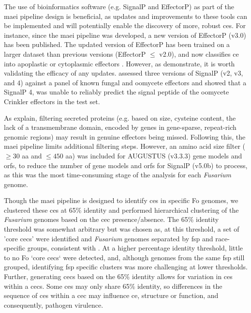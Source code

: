 \bigskip
\noindent
The use of bioinformatics software (e.g. SignalP and EffectorP) as part of the \ac{maei} pipeline design is beneficial, as updates and improvements to these tools can be implemented and will potentially enable the discovery of more, robust \acp{ce}. For instance, since the \ac{maei} pipeline was developed, a new version of EffectorP (v3.0) has been published. The updated version of EffectorP has been trained on a larger dataset than previous versions (EffectorP $\le$ v2.0), and now classifies \acl{ce} into apoplastic or cytoplasmic effectors \parencite{Sperschneider2022}. However, as \textcite{Sperschneider2015c} demonstrate, it is worth validating the efficacy of any updates. \textcite{Sperschneider2015c} assessed three versions of SignalP (v2, v3, and 4) against a panel of known fungal and oomycete effectors and showed that a SignalP 4, was unable to reliably predict the signal peptide of the oomycete Crinkler effectors in the test set. 

As \textcite{LoPresti2015, Sperschneider2015, Sperschneider2015c} explain, filtering secreted proteins (e.g. based on size, cysteine content, the lack of a transmembrane domain, encoded by genes in gene-sparse, repeat-rich genomic regions) may result in genuine effectors being missed. Following this, the \ac{maei} pipeline limits additional filtering steps. However, an amino acid size filter ($\geq30$ aa and $\leq450$ aa) was included for AUGUSTUS (v3.3.3) gene models and \acp{orf}, to reduce the number of gene models and \acp{orf} for SignalP (v5.0b) to process, as this was the most time-consuming stage of the analysis for each \textit{Fusarium} genome. 

Though the \ac{maei} pipeline is designed to identify \acp{ce} in specific \ac{Fo} genomes, we clustered these \acp{ce} at 65\% identity and performed hierarchical clustering of the \textit{Fusarium} genomes based on the \ac{cec} presence/absence. The 65\% identity threshold was somewhat arbitrary but was chosen as, at this threshold, a set of 'core  \acp{cec}' were identified and \textit{Fusarium} genomes separated by \ac{fsp} and race-specific groups, consistent with \textcite{Dam2016,FoEC2}. At a higher percentage identity threshold, little to no \ac{Fo} `core \acp{cec}` were detected, and, although genomes from the same \ac{fsp} still grouped, identifying \ac{fsp} specific clusters was more challenging at lower thresholds. Further, generating \acp{cec} based on the 65\% identity allows for variation in \aclp{ce} within a \acp{cec}. Some \acp{ce} may only share 65\% identity, so differences in the sequence of \acp{ce} within a \ac{cec} may influence \ac{ce}, structure or function, and consequently, pathogen virulence. 

